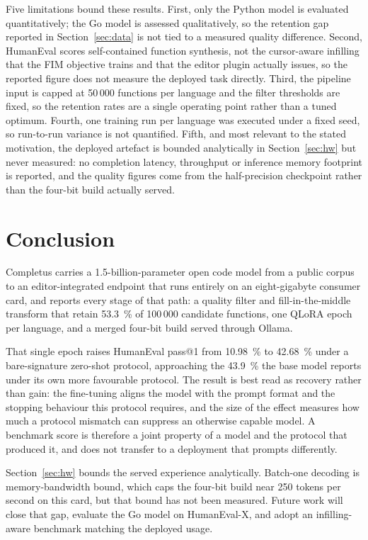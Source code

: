 \documentclass[10pt,conference,a4paper]{IEEEtran}
\begin{document}
Five limitations bound these results. First, only the Python model is
evaluated quantitatively; the Go model is assessed qualitatively, so the
retention gap reported in Section~\ref{sec:data} is not tied to a measured quality
difference. Second, HumanEval scores self-contained function synthesis, not
the cursor-aware infilling that the FIM objective trains and that the editor
plugin actually issues, so the reported figure does not measure the deployed
task directly. Third, the pipeline input is capped at 50\,000 functions per
language and the filter thresholds are fixed, so the retention rates are a
single operating point rather than a tuned optimum. Fourth, one training run
per language was executed under a fixed seed, so run-to-run variance is not
quantified. Fifth, and most relevant to the stated motivation, the deployed
artefact is bounded analytically in Section~\ref{sec:hw} but never measured: no
completion latency, throughput or inference memory footprint is reported, and the quality figures come from the half-precision checkpoint rather than
the four-bit build actually served.

\section{Conclusion}
Completus carries a 1.5-billion-parameter open code model from a public
corpus to an editor-integrated endpoint that runs entirely on an
eight-gigabyte consumer card, and reports every stage of that path: a quality
filter and fill-in-the-middle transform that retain 53.3~\% of 100\,000
candidate functions, one QLoRA epoch per language, and a merged four-bit
build served through Ollama.

That single epoch raises HumanEval pass@1 from 10.98~\% to 42.68~\% under a
bare-signature zero-shot protocol, approaching the 43.9~\% the base model
reports under its own more favourable protocol. The result is best read as
recovery rather than gain: the fine-tuning aligns the model with the prompt
format and the stopping behaviour this protocol requires, and the size of the effect measures how much a
protocol mismatch can suppress an otherwise capable model. A benchmark score
is therefore a joint property of a model and the protocol that produced it,
and does not transfer to a deployment that prompts differently.

Section~\ref{sec:hw} bounds the served experience analytically. Batch-one
decoding is memory-bandwidth bound, which caps the four-bit build near 250
tokens per second on this card, but that bound has not been measured. Future
work will close that gap, evaluate the Go model on HumanEval-X, and adopt an
infilling-aware benchmark matching the deployed usage.
\end{document}
